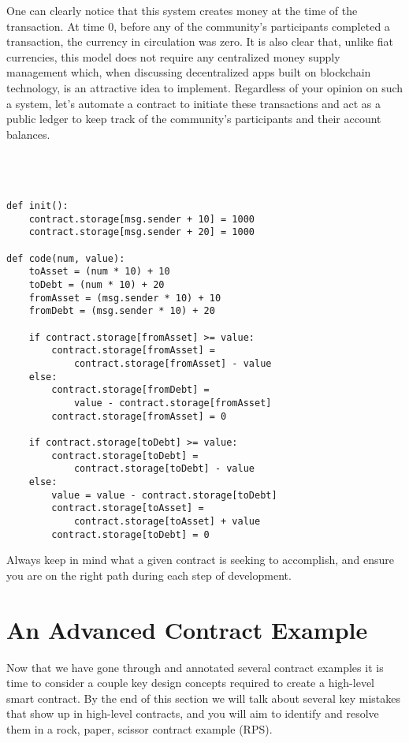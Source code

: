 \documentclass[12pt]{article}
\begin{document}
One can clearly notice that this system creates money at the time of the transaction. At time 0, before any of the community's participants completed a transaction, the currency in circulation was zero. It is also clear that, unlike fiat currencies, this model does not require any centralized money supply management which, when discussing decentralized apps built on blockchain technology, is an attractive idea to implement. Regardless of your opinion on such a system, let's automate a contract to initiate these transactions and act as a public ledger to keep track of the community's participants and their account balances. \\
\\
\\
\\
\begin{lstlisting}[frame=single]
def init():
	contract.storage[msg.sender + 10] = 1000
	contract.storage[msg.sender + 20] = 1000

def code(num, value):
	toAsset = (num * 10) + 10
	toDebt = (num * 10) + 20
	fromAsset = (msg.sender * 10) + 10
	fromDebt = (msg.sender * 10) + 20
	
	if contract.storage[fromAsset] >= value:
		contract.storage[fromAsset] = 
			contract.storage[fromAsset] - value 
	else:
		contract.storage[fromDebt] = 
			value - contract.storage[fromAsset]
		contract.storage[fromAsset] = 0
		
	if contract.storage[toDebt] >= value:
		contract.storage[toDebt] = 
			contract.storage[toDebt] - value
	else:
		value = value - contract.storage[toDebt] 
		contract.storage[toAsset] = 
			contract.storage[toAsset] + value
		contract.storage[toDebt] = 0
\end{lstlisting}

Always keep in mind what a given contract is seeking to accomplish, and ensure you are on the right path during each step of development. 



\section{An Advanced Contract Example}
Now that we have gone through and annotated several contract examples it is time to consider a couple key design concepts required to create a high-level smart contract. By the end of this section we will talk about several key mistakes that show up in high-level contracts, and you will aim to identify and resolve them in a rock, paper, scissor contract example (RPS).
\end{document}
